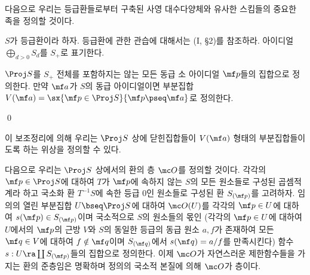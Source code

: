 	
	\begin{example}
	\end{example}
	
	다음으로 우리는 등급환들로부터 구축된 사영 대수다양체와 유사한 스킴들의 중요한 족을 정의할 것이다.
	
	$S$가 등급환이라 하자. 등급환에 관한 관습에 대해서는 (I, \S 2)를 참조하라. 아이디얼 $\bigoplus_{d>0}S_d$를 $S_+$로 표기한다.
	
	 $\Proj S$를 $S_+$ 전체를 포함하지는 않는 모든 동급 소 아이디얼 $\mf p$들의 집합으로 정의한다.
	만약 $\mf a$가 $S$의 동급 아이디얼이면 부분집합 $V(\mf a)=\sx{\mf p\in\Proj S}{\mf p\pseq\mf a}$로 정의한다.
	
	
	\begin{lemma}
	\qed
	\end{lemma}
	
	이 보조정리에 의해 우리는 $\Proj S$ 상에 닫힌집합들이 $V(\mf a)$ 형태의 부분집합들이도록 하는 위상을 정의할 수 있다.
	
	다음으로 우리는 $\Proj S$ 상에서의 환의 층 $\mc O$를 정의할 것이다.
	각각의 $\mf p\in\Proj S$에 대하여 $T$가 $\mf p$에 속하지 않는 $S$의 모든  원소들로 구성된 곱셈적 계라 하고
	국소화 환 $T^{-1}S$에 속한 등급 0인 원소들로 구성된 환 $S_{(\mf p)}$를 고려하자.
	임의의 열린 부분집합 $U\bseq\Proj S$에 대하여 $\mc O(U)$를
	각각의 $\mf p\in U$에 대하여 $s(\mf p)\in S_{(\mf p)}$이며 국소적으로 $S$의 원소들의 몫인
	(각각의 $\mf p\in U$에 대하여 $U$에서의 $\mf p$의 근방 $V$와 $S$의 동일한 등급의 동급 원소 $a,f$가 존재하여
	모든 $\mf q\in V$에 대하여 $f\notin\mf q$이며 $S_{(\mf q)}$에서 $s(\mf q)=a/f$를 만족시킨다)
	함수 $s:U\ra\coprod S_{(\mf p)}$들의 집합으로 정의한다.
	이제 $\mc O$가 자연스러운 제한함수들을 가지는 환의 준층임은 명확하며 정의의 국소적 본질에 의해 $\mc O$가 층이다.
	
